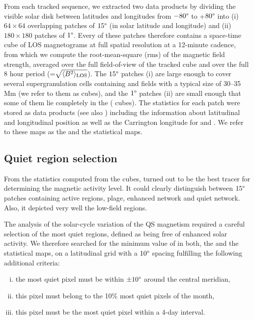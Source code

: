 \documentclass{aa}
\begin{document}
From each tracked sequence, we extracted two data products by dividing the visible solar disk  between latitudes and longitudes from $-80\degree$ to +$80\degree$ into (i) $64\times 64$  overlapping patches of $15\degree$ (in solar latitude and longitude)  and (ii) $180\times 180$ patches of $1\degree$.
Every of these patches therefore contains a space-time cube of LOS magnetograms at full spatial resolution at a 12-minute cadence,
from which we 
compute the 
root-mean-square
(rms) 
of the magnetic field strength, averaged over the full field-of-view of the tracked cube 
and over the full 8 hour period
(\brms{}=$\sqrt{\langle B^2\rangle_{\rm LOS}}$).
The $15\degree$ patches (i) are large enough to cover several supergranulation cells containing \NW{} and \IN{} fields \cite[]{2010LRSP....7....2R} with a typical size of 30--35\,Mm (we refer to them as \nw{} cubes), and the $1\degree$ patches (ii) are small enough that some of them lie completely in the \IN{} (\inw{} cubes). 
The statistics for each patch were stored as data products (see also ) including the information about 
latitudinal and longitudinal position as well as the Carrington 
longitude for \NW{} and \IN{}. We refer to these maps as the \nw{} and the \inw{} statistical maps.

\subsection{Quiet region selection\label{quietregion}}

From the 
statistics computed from the cubes, 
\brms{}
turned out to be the best tracer for determining the magnetic activity level. It could clearly distinguish between $15\degree$ patches containing active regions, plage, enhanced network and quiet network. Also, it depicted very well the low-field \IN{} regions.

The analysis of the solar-cycle variation of the 
QS
magnetism required a careful selection of the most quiet regions, defined as being free of enhanced solar activity. We therefore searched for the minimum value of \brms{} in both, the \nw{} and the \inw{} statistical maps, on a latitudinal grid with a $10\degree$ spacing fulfilling the following additional criteria:
\begin{enumerate}[(i)]
	\item\label{c1} the most quiet pixel must be within $\pm10\degree$ around the central meridian,
	\item\label{c2}  this pixel must belong to the	10\% most quiet pixels of the month,
	\item\label{c3}  this pixel must be the most quiet pixel within a 4-day interval.
\end{enumerate}
\end{document}
